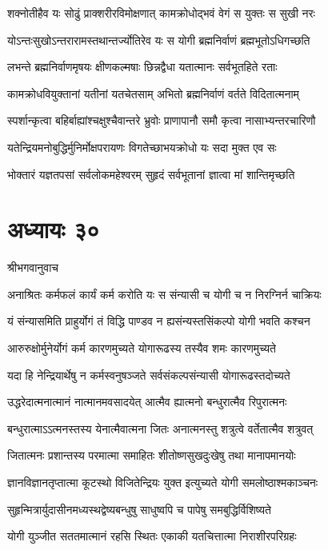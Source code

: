 \twolineshloka
{शक्नोतीहैव यः सोढुं प्राक्शरीरविमोक्षणात्}
{कामक्रोधोद्भवं वेगं स युक्तः स सुखी नरः}


\twolineshloka
{योऽन्तःसुखोऽन्तरारामस्तथान्तर्ज्योतिरेव यः}
{स योगी ब्रह्मनिर्वाणं ब्रह्मभूतोऽधिगच्छति}


\twolineshloka
{लभन्ते ब्रह्मनिर्वाणमृषयः क्षीणकल्मषाः}
{छिन्नद्वैधा यतात्मानः सर्वभूतहिते रताः}


\twolineshloka
{कामक्रोधवियुक्तानां यतीनां यतचेतसाम्}
{अभितो ब्रह्मनिर्वाणं वर्तते विदितात्मनाम्}


\twolineshloka
{स्पर्शान्कृत्वा बहिर्बाह्यांश्चक्षुश्चैवान्तरे भ्रुवोः}
{प्राणापानौ समौ कृत्वा नासाभ्यन्तरचारिणौ}


\threelineshloka
{यतेन्द्रियमनोबुद्धिर्मुनिर्मोक्षपरायणः}
{विगतेच्छाभयक्रोधो यः सदा मुक्त एव सः}
{}


\twolineshloka
{भोक्तारं यज्ञतपसां सर्वलोकमहेश्वरम्}
{सुहृदं सर्वभूतानां ज्ञात्वा मां शान्तिमृच्छति}


\chapter{अध्यायः ३०}
\twolineshloka
{श्रीभगवानुवाच}
{}


\twolineshloka
{अनाश्रितः कर्मफलं कार्यं कर्म करोति यः}
{स संन्यासी च योगी च न निरग्निर्न चाक्रियः}


\twolineshloka
{यं संन्यासमिति प्राहुर्योगं तं विद्धि पाण्डव}
{न ह्यसंन्यस्तसिंकल्पो योगी भवति कश्चन}


\twolineshloka
{आरुरुक्षोर्मुनेर्योगं कर्म कारणमुच्यते}
{योगारूढस्य तस्यैव शमः कारणमुच्यते}


\twolineshloka
{यदा हि नेन्द्रियार्थेषु न कर्मस्वनुषञ्जते}
{सर्वसंकल्पसंन्यासी योगारूढस्तदोच्यते}


\twolineshloka
{उद्धरेदात्मनात्मानं नात्मानमवसादयेत्}
{आत्मैव ह्यात्मनो बन्धुरात्मैव रिपुरात्मनः}


\twolineshloka
{बन्धुरात्माऽऽत्मनस्तस्य येनात्मैवात्मना जितः}
{अनात्मनस्तु शत्रुत्वे वर्तेतात्मैव शत्रुवत्}


\twolineshloka
{जितात्मनः प्रशान्तस्य परमात्मा समाहितः}
{शीतोष्णसुखदुःखेषु तथा मानापमानयोः}


\twolineshloka
{ज्ञानविज्ञानतृप्तात्मा कूटस्थो विजितेन्द्रियः}
{युक्त इत्युच्यते योगी समलोष्ठाश्मकाञ्चनः}


\twolineshloka
{सुहृन्मित्रार्युदासीनमध्यस्थद्वेष्यबन्धुषु}
{साधुष्वपि च पापेषु समबुद्धिर्विशिष्यते}


\twolineshloka
{योगी युञ्जीत सततमात्मानं रहसि स्थितः}
{एकाकी यतचित्तात्मा निराशीरपरिग्रहः}


